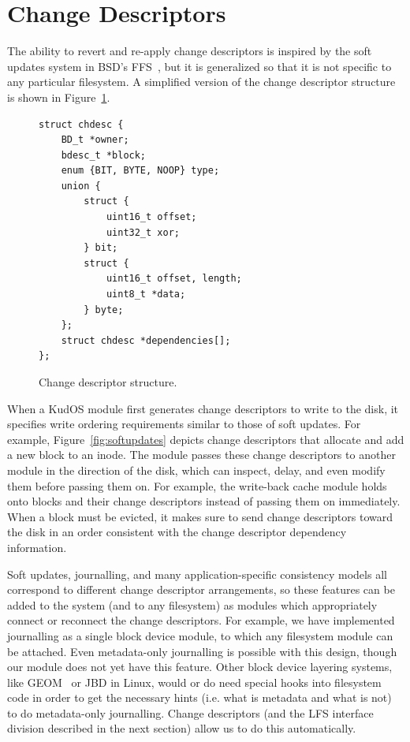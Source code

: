 \preparagraphspacing{}
\section*{Change Descriptors}
\label{sec:chdescs}

The ability to revert and re-apply change descriptors is inspired by the soft
updates system in BSD's FFS~\cite{ganger00soft}, but it is generalized so that
it is not specific to any particular filesystem. A simplified version of the
change descriptor structure is shown in Figure~\ref{fig:chdesc}.

\begin{figure}
{\footnotesize
\begin{verbatim}
struct chdesc {
    BD_t *owner;
    bdesc_t *block;
    enum {BIT, BYTE, NOOP} type;
    union {
        struct {
            uint16_t offset;
            uint32_t xor;
        } bit;
        struct {
            uint16_t offset, length;
            uint8_t *data;
        } byte;
    };
    struct chdesc *dependencies[];
};
\end{verbatim}
}
\vspace{-14pt}
\caption{\label{fig:chdesc} Change descriptor structure.}
\end{figure}

When a KudOS module first generates change descriptors to write to the disk, it
specifies write ordering requirements similar to those of soft updates. For
example, Figure~\ref{fig:softupdates} depicts change descriptors that allocate
and add a new block to an inode.
%
The module passes these change descriptors to another module in the direction of
the disk, which can inspect, delay, and even modify them before passing them on.
%
For example, the write-back cache module holds onto blocks and their change
descriptors instead of passing them on immediately.
%
When a block must be evicted, it makes sure to send change descriptors toward
the disk in an order consistent with the change descriptor dependency
information.

Soft updates, journalling, and many application-specific consistency models all
correspond to different change descriptor arrangements, so these features can be
added to the system (and to any filesystem) as modules which appropriately
connect or reconnect the change descriptors. For example, we have implemented
journalling as a single block device module, to which any filesystem module can
be attached. Even metadata-only journalling is possible with this design, though
our module does not yet have this feature. Other block device layering systems,
like GEOM~\cite{geom} or JBD in Linux, would or do need special hooks into
filesystem code in order to get the necessary hints (i.e. what is metadata and
what is not) to do metadata-only journalling. Change descriptors (and the LFS
interface division described in the next section) allow us to do this
automatically.

